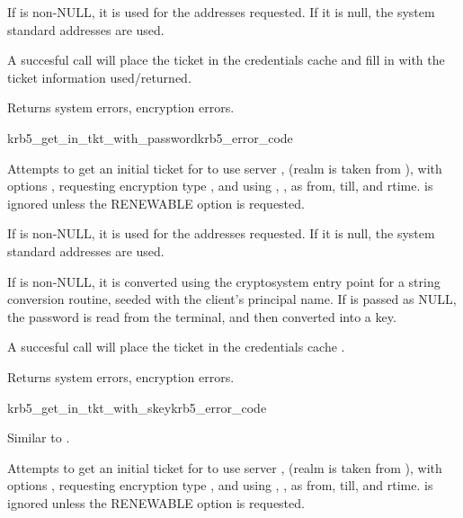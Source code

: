 If  is non-NULL, it is used for the addresses
requested.  If it is null, the system standard addresses are used.

A succesful call will place the ticket in the credentials cache
 and fill in  with the ticket
information used/returned.

Returns system errors, encryption errors.

\begin{funcdecl}{krb5_get_in_tkt_with_password}{krb5_error_code}{\funcin}
\funcinout
{}
\end{funcdecl}


Attempts to get an initial ticket for  to use server
, (realm is taken from
), with options 
, requesting encryption type , and using
,
,
as from, till, and rtime.   is
ignored unless the RENEWABLE option is requested.

If  is non-NULL, it is used for the addresses
requested.  If it is null, the system standard addresses are used.

If  is non-NULL, it is converted using the
cryptosystem entry point for a string conversion routine, seeded with
the client's principal name.  If  is passed as NULL,
the password is read from the terminal, and then converted into a key.

A succesful call will place the ticket in the credentials cache
.

Returns system errors, encryption errors.

\begin{funcdecl}{krb5_get_in_tkt_with_skey}{krb5_error_code}{\funcin}
\funcinout
{}
\end{funcdecl}
Similar to .

Attempts to get an initial ticket for  to use server
, (realm is taken from
), with options , requesting
encryption type , and using 
, ,
 as from, till, and rtime.
 is ignored unless the
RENEWABLE option is requested.

